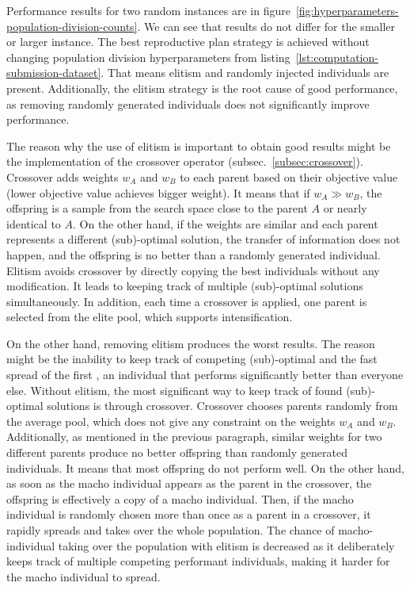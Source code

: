 Performance results for two random instances are in figure~\ref{fig:hyperparameters-population-division-counts}.
We can see that results do not differ for the smaller or larger instance.
The best reproductive plan strategy is achieved without changing population division hyperparameters from listing~\ref{lst:computation-submission-dataset}.
That means elitism and randomly injected individuals are present.
Additionally, the elitism strategy is the root cause of good performance,
as removing randomly generated individuals does not significantly improve performance.

The reason why the use of elitism is important to obtain good results might be the implementation of the crossover operator (subsec.~\ref{subsec:crossover}).
Crossover adds weights $w_A$ and $w_B$ to each parent based on their objective value (lower objective value achieves bigger weight).
It means that if $w_A \gg w_B$, the offspring is a sample from the search space close to the parent $A$ or nearly identical to $A$.
On the other hand, if the weights are similar and each parent represents a different (sub)-optimal solution,
the transfer of information does not happen, and the offspring is no better than a randomly generated individual.
Elitism avoids crossover by directly copying the best individuals without any modification.
It leads to keeping track of multiple (sub)-optimal solutions simultaneously.
In addition, each time a crossover is applied, one parent is selected from the elite pool,
which supports intensification.

On the other hand, removing elitism produces the worst results.
The reason might be the inability to keep track of competing (sub)-optimal and the fast spread of the first
, an individual that performs significantly better than everyone else.
Without elitism, the most significant way to keep track of found (sub)-optimal solutions is through crossover.
Crossover chooses parents randomly from the average pool, which does not give any constraint on the weights $w_A$ and $w_B$.
Additionally, as mentioned in the previous paragraph, similar weights for two different parents produce no better offspring than randomly generated individuals.
It means that most offspring do not perform well.
On the other hand, as soon as the macho individual appears as the parent in the crossover, the offspring is effectively a copy of a macho individual.
Then, if the macho individual is randomly chosen more than once as a parent in a crossover, it rapidly spreads and takes over the whole population.
The chance of macho-individual taking over the population with elitism is decreased as it deliberately keeps track of multiple competing performant individuals,
making it harder for the macho individual to spread.

